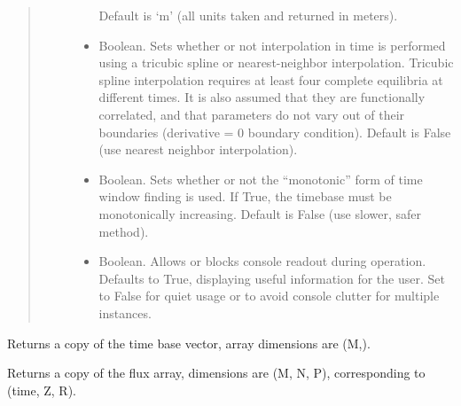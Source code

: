 \documentclass[letterpaper,10pt,english]{sphinxmanual}
\begin{document}
\begin{fulllineitems}
\begin{quote}
\begin{description}
\begin{itemize}
Default is ‘m’ (all units taken and returned in meters).


\item {} 
 \textendash{} Boolean.
Sets whether or not interpolation in time is
performed using a tricubic spline or nearest-neighbor
interpolation. Tricubic spline interpolation requires at least
four complete equilibria at different times. It is also assumed
that they are functionally correlated, and that parameters do
not vary out of their boundaries (derivative = 0 boundary
condition). Default is False (use nearest neighbor interpolation).

\item {} 
 \textendash{} Boolean.
Sets whether or not the “monotonic” form of time window
finding is used. If True, the timebase must be monotonically
increasing. Default is False (use slower, safer method).

\item {} 
 \textendash{} Boolean.
Allows or blocks console readout during operation.  Defaults to True,
displaying useful information for the user.  Set to False for quiet
usage or to avoid console clutter for multiple instances.

\end{itemize}

\end{description}\end{quote}

\begin{fulllineitems}
\label{\detokenize{eqtools:eqtools.FromArrays.ArrayEquilibrium.getTimeBase}}
Returns a copy of the time base vector, array dimensions are (M,).

\end{fulllineitems}


\begin{fulllineitems}
\label{\detokenize{eqtools:eqtools.FromArrays.ArrayEquilibrium.getFluxGrid}}
Returns a copy of the flux array, dimensions are (M, N, P), corresponding to (time, Z, R).


\end{fulllineitems}
\end{fulllineitems}
\end{document}
